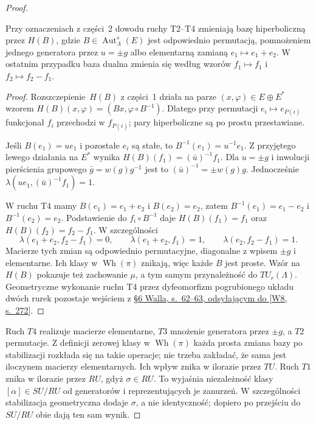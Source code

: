 \begin{proof}
\begin{lemat}
\label{lem:wall-odd-t234-22}
Przy oznaczeniach z części~2 dowodu ruchy T2--T4
zmieniają bazę hiperboliczną przez $H(B)$,
gdzie $B\in\operatorname{Aut}^s_\Lambda(E)$ jest odpowiednio
permutacją, pomnożeniem jednego generatora przez
$u=\pm g$ albo elementarną zamianą
$e_1\mapsto e_1+e_2$. W ostatnim przypadku
baza dualna zmienia się według wzorów
$f_1\mapsto f_1$ i $f_2\mapsto f_2-f_1$.
\end{lemat}
\begin{proof}
Rozszczepienie~$H(B)$ z części~1 działa na parze
$(x,\varphi)\in E\oplus E^*$ wzorem
$H(B)(x,\varphi)=(Bx,\varphi\circ B^{-1})$.
Dlatego przy permutacji $e_i\mapsto e_{P(i)}$
funkcjonał $f_i$ przechodzi w $f_{P(i)}$;
pary hiperboliczne są po prostu przestawiane.

Jeśli $B(e_1)=u e_1$ i pozostałe $e_i$ są stałe,
to $B^{-1}(e_1)=u^{-1}e_1$. Z przyjętego
lewego działania na $E^*$ wynika
$H(B)(f_1)=(\bar u)^{-1}f_1$.
Dla $u=\pm g$ i inwolucji pierścienia grupowego
$\bar g=w(g)g^{-1}$ jest to
$(\bar u)^{-1}=\pm w(g)g$.
Jednocześnie $\lambda(u e_1,(\bar u)^{-1}f_1)=1$.

W ruchu T4 mamy
$B(e_1)=e_1+e_2$ i $B(e_2)=e_2$, zatem
$B^{-1}(e_1)=e_1-e_2$ i $B^{-1}(e_2)=e_2$.
Podstawienie do $f_i\circ B^{-1}$ daje
$H(B)(f_1)=f_1$ oraz $H(B)(f_2)=f_2-f_1$.
W szczególności
\[
 \lambda(e_1+e_2,f_2-f_1)=0,
 \qquad
 \lambda(e_1+e_2,f_1)=1,
 \qquad
 \lambda(e_2,f_2-f_1)=1.
\]
Macierze tych zmian są odpowiednio permutacyjne,
diagonalne z wpisem $\pm g$ i elementarne.
Ich klasy w $\operatorname{Wh}(\pi)$ znikają,
więc każde $B$ jest proste. Wzór na $H(B)$
pokazuje też zachowanie $\mu$, a tym samym
przynależność do $TU_r(\Lambda)$.
Geometryczne wykonanie ruchu T4 przez
dyfeomorfizm pogrubionego układu dwóch rurek
pozostaje wejściem z
\href{https://www.maths.ed.ac.uk/~v1ranick/books/scm.pdf}
{§6 Walla, s.~62--63, odsyłającym do [W8, s.~272]}.
\end{proof}

Ruch $T4$ realizuje macierze elementarne,
$T3$ mnożenie generatora przez $\pm g$,
a $T2$ permutacje. Z definicji zerowej
klasy w $\operatorname{Wh}(\pi)$ każda prosta
zmiana bazy po stabilizacji rozkłada się
na takie operacje; nie trzeba zakładać,
że sama jest iloczynem macierzy elementarnych.
Ich wpływ znika w ilorazie przez $TU$.
Ruch $T1$ znika w
ilorazie przez $RU$, gdyż $\sigma\in RU$.
To wyjaśnia niezależność klasy
$[\alpha]\in SU/RU$ od generatorów i
reprezentujących je zanurzeń. W szczególności
stabilizacja geometryczna dodaje $\sigma$,
a nie identyczność; dopiero po przejściu
do $SU/RU$ obie dają ten sam wynik.


\end{proof}
